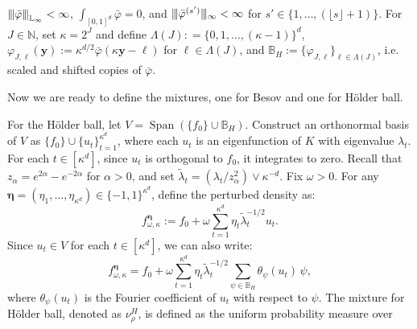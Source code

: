 \documentclass[twoside,11pt]{article}
\newcommand{\Ell}{\mathbb{L}}
\newcommand{\normEllp}[3]{
	\vertiii{#1}_{\Ell_{#2}}^{#3}
}
\newcommand{\vertiii}[1]{
	{\left\vert\kern-0.25ex\left\vert\kern-0.25ex\left\vert #1 
		\right\vert\kern-0.25ex\right\vert\kern-0.25ex\right\vert}
}%
\newcommand{\vectorize}[1]{\mathbf{#1}}
\newcommand{\dimDensity}{d} %
\newcommand{\ONset}{\mathbb{B}}
\newcommand{\privacyParameter}{\alpha} %
\newcommand{\binNum}{\kappa}           %
\newcommand{\coef}{\theta}
\newcommand{\primResLev}{J}
\newcommand{\wavMotherUnivIndex}{\ell}
\newcommand{\wavMotherIndex}{\boldsymbol{\wavMotherUnivIndex}}
\newcommand{\domainTs}{
	[0,1]^{{\dimDensity}}
}
\newcommand{\bumpHolder}{\varphi}
\begin{document}
\begin{appendix}
\begin{definition}
		$\normEllp{\bar{\varphi}}{\infty}{}<\infty$,
		$\int_{\domainTs} \bar{\varphi} =0$,
		and
		$\vert\kern-0.25ex\vert\kern-0.25ex\vert \bar{\varphi}^{(s')} 
		\vert\kern-0.25ex \vert\kern-0.25ex \vert_\infty < \infty
		$
		for $s' \in  \{ 1, \ldots,  (\lfloor s \rfloor+1)\}$.
		For \( \primResLev \in \mathbb{N} \), set \( \binNum = 2^\primResLev \) and define
		$ \Lambda(\primResLev): = \{0, 1, \dots, (\binNum - 1)\}^\dimDensity $,
		$\bumpHolder_{\primResLev, \wavMotherIndex}(\vectorize{y})
		:=
		\binNum^{\dimDensity/2}
		\bar{\varphi}(
		\binNum \vectorize{y} - \wavMotherIndex
		)
		$
		for \( \wavMotherIndex \in \Lambda(J) \),
		and
		$
		\ONset_{H} := \{ \bumpHolder_{\primResLev, \wavMotherIndex} \}_{\wavMotherIndex \in \Lambda(J)}$, i.e. scaled and shifted copies of $\bar{\varphi}$.
	\end{definition}
	Now we are ready to define the mixtures, one for Besov and one for H\"{o}lder ball.
	\begin{definition}
		For the H\"older ball, let \( V = \operatorname{Span}(\{f_0\} \cup \ONset_{H}) \). Construct an orthonormal basis of \( V \) as \( \{f_0\} \cup \{u_t\}_{t=1}^{\binNum^\dimDensity}\), where each \( u_t \) is an eigenfunction of \( K \) with eigenvalue \( \lambda_t \). For each $t \in [\binNum^\dimDensity]$, since \( u_t \) is orthogonal to \( f_0 \), it integrates to zero.
		Recall that \( z_\privacyParameter = e^{2\privacyParameter} - e^{-2\privacyParameter} \) for \( \privacyParameter > 0 \),
		and set \( \tilde{\lambda}_t =  (\lambda_t / z_\privacyParameter^2) \vee \binNum^{-d} \).
		Fix \( \omega > 0 \). For any \( \boldsymbol{\eta} = (\eta_1, \ldots, \eta_{\binNum^{d}}) \in \{-1, 1\}^{\binNum^{d}} \), define the perturbed density as:
		\begin{equation}\label{eq:eigen_expansion}
			f^{\boldsymbol{\eta}}_{\omega, \binNum} := f_0 + \omega \sum_{t=1}^{\binNum^{d}} \eta_t \tilde{\lambda}_t^{-1/2} u_t.  
		\end{equation}
		Since  \( u_t \in V \) for each $t \in [\binNum^\dimDensity]$, we can also write:
		\begin{equation}\label{eq:eigenfunction_expansion_by_basis}
			f^{\boldsymbol{\eta}}_{\omega, \binNum} = f_0 + \omega \sum_{t=1}^{\binNum^{d}} \eta_t \tilde{\lambda}_t^{-1/2} \sum_{\psi \in \ONset_{H}} \coef_{\psi}(u_t) \, \psi,  
		\end{equation}
		where \( \coef_{\psi}(u_t) \) is the Fourier coefficient of \( u_t \) with respect to \( \psi \).
		The mixture for H\"{o}lder ball, denoted as $\nu_\rho^H$, is defined as  the uniform probability measure over

\end{definition}
\end{appendix}
\end{document}
